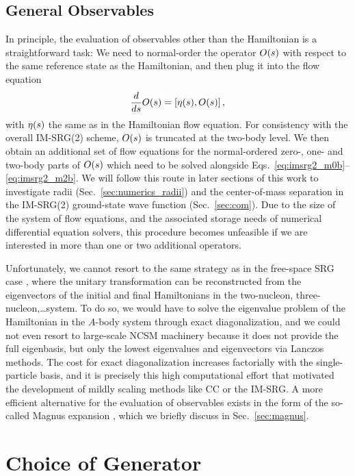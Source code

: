 \subsection{General Observables\label{sec:observables}}
In principle, the evaluation of observables other than the Hamiltonian
is a straightforward task: We need to normal-order the operator
$O(s)$ with respect to the same reference state as the Hamiltonian,
and then plug it into the flow equation
\begin{equation}\label{eq:obsflow}
  \totd{}{s}\OO(s) = \comm{\etaO(s)}{\OO(s)}\,,
\end{equation} 
with $\eta(s)$ the same as in the Hamiltonian flow equation. For
consistency with the overall IM-SRG(2) scheme, $O(s)$ is truncated
at the two-body level. We then obtain an additional set of flow
equations for the normal-ordered zero-, one- and two-body parts of
$O(s)$ which need to be solved alongside
Eqs.~\eqref{eq:imsrg2_m0b}--\eqref{eq:imsrg2_m2b}. We will follow this
route in later sections of this work to investigate radii
(Sec.~\ref{sec:numerics_radii}) and the center-of-mass separation in
the IM-SRG(2) ground-state wave function (Sec.~\ref{sec:com}). Due to
the size of the system of flow equations, and the associated storage
needs of numerical differential equation solvers, this procedure
becomes unfeasible if we are interested in more than one or two
additional operators.

Unfortunately, we cannot resort to the same strategy as in the
free-space SRG case \cite{Anderson:2010br,Bogner:2010pq}, where the
unitary transformation can be reconstructed from the eigenvectors of
the initial and final Hamiltonians in the two-nucleon,
three-nucleon,\ldots system. To do so, we would have to solve the
eigenvalue problem of the Hamiltonian in the $A$-body system through
exact diagonalization, and we could not even resort to large-scale
NCSM machinery because it does not provide the full eigenbasis, but
only the lowest eigenvalues and eigenvectors via Lanczos methods. The
cost for exact diagonalization increases factorially with the
single-particle basis, and it is precisely this high computational
effort that motivated the development of mildly scaling methods like
CC or the IM-SRG. A more efficient alternative for the evaluation of
observables exists in the form of the so-called Magnus expansion
\cite{Blanes:2009fk,Morris:2015ve}, which we briefly discuss in
Sec.~\ref{sec:magnus}.



\section{\label{sec:generators}Choice of Generator}

